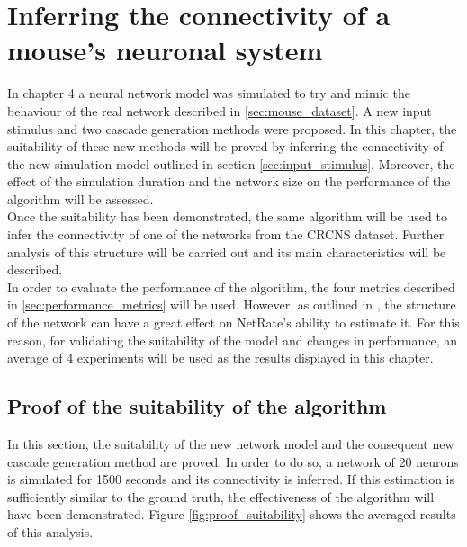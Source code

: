 
\chapter{Inferring the connectivity of a mouse's neuronal system}

In chapter 4 a neural network model was simulated to try and mimic the behaviour of the real network described in \ref{sec:mouse_dataset}. A new input stimulus and two cascade generation methods were proposed. In this chapter, the suitability of these new methods will be proved by inferring the connectivity of the new simulation model outlined in section \ref{sec:input_stimulus}. Moreover, the effect of the simulation duration and the network size on the performance of the algorithm will be assessed.\\

Once the suitability has been demonstrated, the same algorithm will be used to infer the connectivity of one of the networks from the CRCNS dataset. Further analysis of this structure will be carried out and its main characteristics will be described.\\

In order to evaluate the performance of the algorithm, the four metrics described in \ref{sec:performance_metrics} will be used. However, as outlined in \cite{pranav_report}, the structure of the network can have a great effect on NetRate's ability to estimate it. For this reason, for validating the suitability of the model and changes in performance, an average of 4 experiments will be used as the results displayed in this chapter.

\section{Proof of the suitability of the algorithm}\label{sec:proof_suitability}

In this section, the suitability of the new network model and the consequent new cascade generation method are proved. In order to do so, a network of 20 neurons is simulated for 1500 seconds and its connectivity is inferred. If this estimation is sufficiently similar to the ground truth, the effectiveness of the algorithm will have been demonstrated. Figure \ref{fig:proof_suitability} shows the averaged results of this analysis.\\

